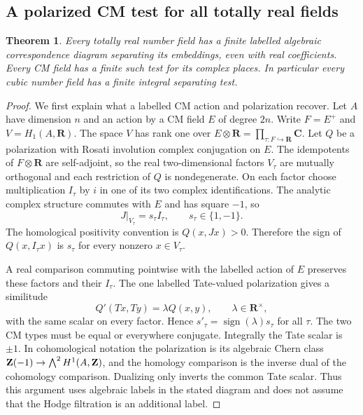 \documentclass[11pt]{article}
\newtheorem{theorem}{Theorem}[section]
\theoremstyle{definition}\newtheorem{definition}[theorem]{Definition}
\theoremstyle{remark}\newtheorem{remark}[theorem]{Remark}
\newcommand{\R}{\mathbf R}\newcommand{\C}{\mathbf C}
\begin{document}
\subsection{A polarized CM test for all totally real fields}
\begin{theorem}\label{thm:real-field-CM-test}
Every totally real number field has a finite labelled algebraic
correspondence diagram separating its embeddings, even with real
coefficients. Every CM field has a finite such test for its complex places.
In particular every cubic number field has a finite integral separating test.
\end{theorem}
\begin{proof}
We first explain what a labelled CM action and polarization recover.
Let $A$ have dimension $n$ and an action by a CM field $E$ of degree $2n$.
Write $F=E^+$ and $V=H_1(A,\R)$. The space $V$ has rank one over
$E\otimes\R=\prod_{\tau:F\hookrightarrow\R}\C$.
Let $Q$ be a polarization with Rosati involution complex conjugation
on $E$. The idempotents of $F\otimes\R$ are self-adjoint, so the real
two-dimensional factors $V_\tau$ are mutually orthogonal and each
restriction of $Q$ is nondegenerate. On each factor choose multiplication
$I_\tau$ by $i$ in one of its two complex identifications. The analytic
complex structure commutes with $E$ and has square $-1$, so
\[
 J|_{V_\tau}=s_\tau I_\tau,\qquad s_\tau\in\{1,-1\}.
\]
The homological positivity convention is $Q(x,Jx)>0$. Therefore the
sign of $Q(x,I_\tau x)$ is $s_\tau$ for every nonzero $x\in V_\tau$.

A real comparison commuting pointwise with the labelled action of $E$
preserves these factors and their $I_\tau$. The one labelled Tate-valued
polarization gives a similitude
\[
 Q'(Tx,Ty)=\lambda Q(x,y),\qquad\lambda\in\R^\times,
\]
with the same scalar on every factor. Hence
$s'_\tau=\operatorname{sign}(\lambda)s_\tau$ for all $\tau$.
The two CM types must be equal or everywhere conjugate. Integrally the
Tate scalar is $\pm1$. In cohomological notation the polarization is its
algebraic Chern class $\mathbf Z(-1)\to\bigwedge^2H^1(A,\mathbf Z)$, and the homology
comparison is the inverse dual of the cohomology comparison. Dualizing
only inverts the common Tate scalar. Thus this argument uses algebraic
labels in the stated diagram and does not assume that the Hodge
filtration is an additional label.


\end{proof}
\end{document}
